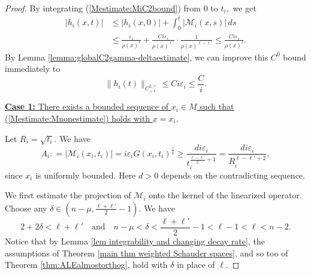 \documentclass[12pt]{amsart}
\newcommand{\calM}{\mathcal{M}}
\renewcommand{\1}{{\mathbf 1}}
\newcommand{\eps}{{\varepsilon}}
\theoremstyle{others}
\numberwithin{equation}{section}
\begin{document}
\begin{proof}
    By integrating (\ref{Mestimate:MiC2bound}) from $0$ to $t_i,$ we get
    \begin{equation}\label{Mestimate:hiC2-ellbound}
    \begin{split}
        |h_i(x,t) | & \leq |h_i(x,0)| + \int_0^t \left| \calM_i(x,s) \right| \, ds \\
        & \leq  \frac{\eps_i}{\rho(x)^{\ell} } + \frac{C i \eps_i}{\rho(x)^{\ell'} } \cdot \frac{1}{\rho(x)^{\ell - \ell' } } \leq \frac{C i \eps_i}{\rho(x)^{\ell } }.
        \end{split}
    \end{equation}
    By Lemma \ref{lemma:globalC2gamma-deltaestimate}, we can improve this $C^0$ bound immediately to
    \begin{equation}\label{Mestimate:hC2gammaellbound}
        \| h_i(t) \|_{C^{2,\gamma}_{-\ell}} \leq C i \eps_i \leq \frac{C}{i}.
    \end{equation}

    \vspace{2mm}

\noindent   \underline{ {\bf Case 1:} There exists a bounded sequence of $x_i \in M$ such that (\ref{Mestimate:Mnonestimate}) holds with $x = x_i.$}

Let $R_i = \sqrt{t_i}.$ We have
    \begin{equation}\label{Mestimate:Aidef}
        A_i : = |\calM_i(x_i,t_i) | = i \eps_i G(x_i,t_i)^\frac{1}{q} \geq \frac{d i \eps_i}{t_i^{\frac{\ell - \ell'}{2} + 1} } = \frac{d i \eps_i}{R_i^{\ell - \ell' + 2}  },
    \end{equation}
    since $x_i$ is uniformly bounded. Here $d > 0$ depends on the contradicting sequence.

We first estimate the projection of $\calM_i$ onto the kernel of the linearized operator. 
Choose any $\delta \in \left( n - \mu , \frac{\ell + \ell'}2 -1 \right).$ %
We have
\begin{equation}
    \label{Mestimate:kdeltaell}
    2 + 2 \delta < \ell + \ell'  \quad \text{and} \quad 
    n - \mu < \delta < \frac{\ell + \ell'}2 -1 < \ell - 1 < \ell < n-2.
\end{equation}
Notice that by Lemma \ref{lem integrability and changing decay rate},
the assumptions of Theorem \ref{main thm weighted Schauder spaces}, and so too of Theorem \ref{thm:ALEalmostorthog}, hold with $\delta$ in place of $\ell.$




\end{proof}
\end{document}

